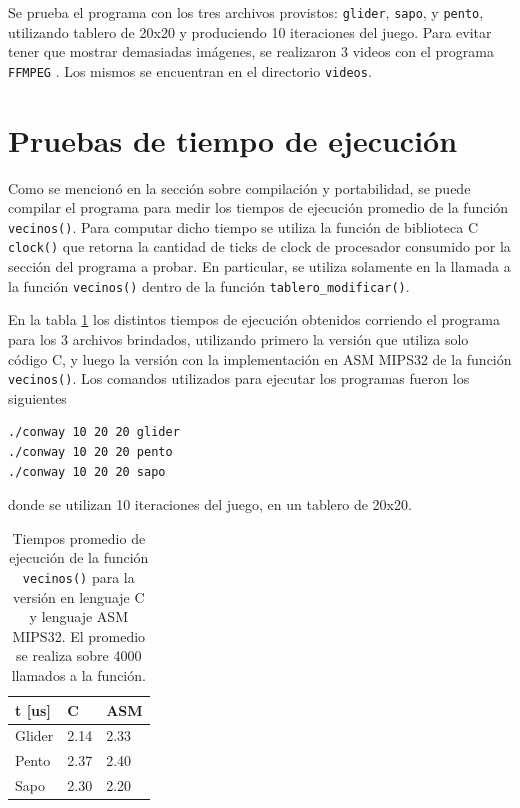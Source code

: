 \documentclass[a4paper,12pt]{article}
\numberwithin{equation}{section}
\numberwithin{figure}{section}
\begin{document}
Se prueba el programa con los tres archivos provistos: \texttt{glider}, \texttt{sapo}, y \texttt{pento}, utilizando tablero de 20x20 y produciendo 10 iteraciones del juego. Para evitar tener que mostrar demasiadas imágenes, se realizaron 3 videos con el programa \texttt{FFMPEG} \cite{tool_ffmpeg}. Los mismos se encuentran en el directorio \texttt{videos}.

\section{Pruebas de tiempo de ejecución}

Como se mencionó en la sección sobre compilación y portabilidad, se puede compilar el programa para medir los tiempos de ejecución promedio de la función \texttt{vecinos()}. Para computar dicho tiempo se utiliza la función de biblioteca C \texttt{clock()} que retorna la cantidad de ticks de clock de procesador consumido por la sección del programa a probar. En particular, se utiliza solamente en la llamada a la función \texttt{vecinos()} dentro de la función \texttt{tablero\_modificar()}.

En la tabla \ref{tabla_tiempos_promedios} los distintos tiempos de ejecución obtenidos corriendo el programa para los 3 archivos brindados, utilizando primero la versión que utiliza solo código C, y luego la versión con la implementación en ASM MIPS32 de la función \texttt{vecinos()}. Los comandos utilizados para ejecutar los programas fueron los siguientes
\begin{lstlisting}[language=bash, style=StyleC]
./conway 10 20 20 glider
./conway 10 20 20 pento
./conway 10 20 20 sapo
\end{lstlisting}
donde se utilizan 10 iteraciones del juego, en un tablero de 20x20.

\begin{table}[ht!]
\centering
\begin{tabular}{|l|l|l|}
\hline 
t {[}us{]} & C    & ASM  \\
\hline 
Glider     & 2.14 & 2.33 \\
Pento      & 2.37 & 2.40 \\
Sapo       & 2.30 & 2.20 \\
\hline 
\end{tabular}
\caption{Tiempos promedio de ejecución de la función \texttt{vecinos()} para la versión en lenguaje C y lenguaje ASM MIPS32. El promedio se realiza sobre 4000 llamados a la función.}
\label{tabla_tiempos_promedios}
\end{table}
\end{document}
